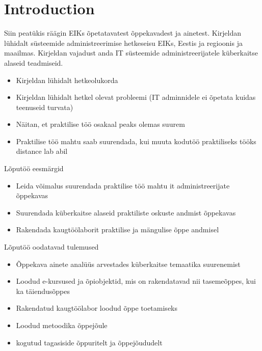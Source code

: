 \chapter{Introduction}
\label{Introduction}


Siin peatükis räägin EIKs õpetatavatest õppekavadest ja ainetest. Kirjeldan lühidalt süsteemide administreerimise hetkeseisu EIKs, Eestis ja regioonis ja maailmas. Kirjeldan vajadust anda IT süsteemide administreerijatele küberkaitse alaseid teadmiseid.

\begin{itemize}
	\item Kirjeldan lühidalt hetkeolukorda
	\item Kirjeldan lühidalt hetkel olevat probleemi (IT adminnidele ei õpetata kuidas teenuseid turvata)
	\item Näitan, et praktilise töö osakaal peaks olemas suurem
	\item Praktilise töö mahtu saab suurendada, kui muuta kodutöö praktiliseks tööks distance lab abil
	
\end{itemize}

Lõputöö eesmärgid
\begin{itemize}
	\item Leida võimalus suurendada praktilise töö mahtu it administreerijate õppekavas
	\item Suurendada küberkaitse alaseid praktiliste oskuste andmist õppekavas
	\item Rakendada kaugtöölaborit praktilise ja mängulise õppe andmisel
\end{itemize}


Lõputöö oodatavad tulemused
\begin{itemize}
	\item Õppekava ainete analüüs arvestades küberkaitse temaatika suurenemist
	\item Loodud e-kursused ja õpiobjektid, mis on rakendatavad nii tasemeõppes, kui ka täiendusõppes
	\item Rakendatud kaugtöölabor loodud õppe toetamiseks
	\item Loodud metoodika õppejõule
	\item kogutud tagasiside õppuritelt ja õppejõududelt
\end{itemize}